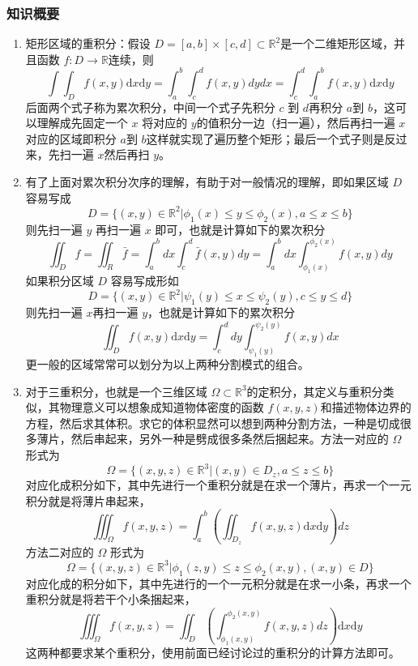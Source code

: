 \subsubsection{知识概要}
\begin{enumerate}
    \item 矩形区域的重积分：假设 $D=[a,b]\times[c,d]\subset\mathbb{R}^2$是一个二维矩形区域，并且函数 $f: D \to \mathbb{R} $连续，则
    $$
    \int\int_Df(x,y)\mathrm{d}x\mathrm{d}y=\int_a^b\int_c^df(x,y)dydx=\int_c^d\int_a^bf(x,y)\mathrm{d}x\mathrm{d}y
    $$
    后面两个式子称为累次积分，中间一个式子先积分 $c$ 到 $d$再积分 $a$到 $b$，这可以理解成先固定一个 $x$ 将对应的 $y$的值积分一边（扫一遍），然后再扫一遍 $x$ 对应的区域即积分 $a$到 $b$这样就实现了遍历整个矩形；最后一个式子则是反过来，先扫一遍 $x$然后再扫 $y$。

    \item 有了上面对累次积分次序的理解，有助于对一般情况的理解，即如果区域 $D$ 容易写成
    $$
    D=\{(x,y)\in\mathbb{R}^2|\phi_1(x)\leq y\leq\phi_2(x),a\leq x\leq b\}
    $$
    则先扫一遍 $y$ 再扫一遍 $x$ 即可，也就是计算如下的累次积分
    $$
    \iint_Df=\iint_R\bar{f}=\int_a^bdx\int_c^d\bar{f}(x,y)dy=\int_a^bdx\int_{\phi_1(x)}^{\phi_2(x)}f(x,y)dy
    $$
    如果积分区域 $D$ 容易写成形如
    $$
    D=\{(x,y)\in\mathbb{R}^2|\psi_1(y)\leq x\leq\psi_2(y),c\leq y\leq d\}
    $$
    则先扫一遍 $x$再扫一遍 $y$，也就是计算如下的累次积分
    $$
    \iint_Df(x,y)\mathrm{d}x\mathrm{d}y=\int_c^ddy\int_{\psi_1(y)}^{\psi_2(y)}f(x,y)dx
    $$
    更一般的区域常常可以划分为以上两种分割模式的组合。

    \item 对于三重积分，也就是一个三维区域 $\Omega \subset \mathbb{R}^3$的定积分，其定义与重积分类似，其物理意义可以想象成知道物体密度的函数 $f(x,y,z)$和描述物体边界的方程，然后求其体积。求它的体积显然可以想到两种分割方法，一种是切成很多薄片，然后串起来，另外一种是劈成很多条然后捆起来。方法一对应的 $\Omega$ 形式为
    $$
    \Omega=\{(x,y,z)\in\mathbb{R}^3|(x,y)\in D_z,a\leq z\leq b\}
    $$
    对应化成积分如下，其中先进行一个重积分就是在求一个薄片，再求一个一元积分就是将薄片串起来，
    $$
    \iiint_\Omega f(x,y,z)=\int_a^b\left(\iint_{D_z}f(x,y,z)\mathrm{d}x\mathrm{d}y\right)dz
    $$
    方法二对应的 $\Omega$ 形式为
    $$
    \Omega=\{(x,y,z)\in\mathbb{R}^3|\phi_1(z,y)\leq z\leq\phi_2(x,y),(x,y)\in D\}
    $$
    对应化成的积分如下，其中先进行的一个一元积分就是在求一小条，再求一个重积分就是将若干个小条捆起来，
    $$
    \iiint_\Omega f(x,y,z)=\iint_D\left(\int_{\phi_1(x,y)}^{\phi_2(x,y)}f(x,y,z)dz\right)\mathrm{d}x\mathrm{d}y
    $$
    这两种都要求某个重积分，使用前面已经讨论过的重积分的计算方法即可。
\end{enumerate}

